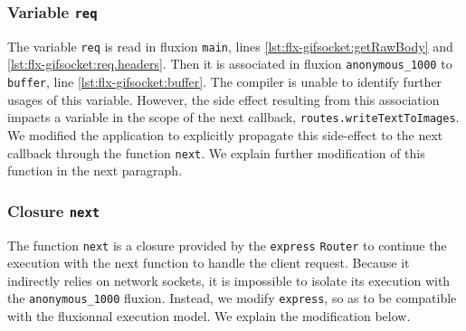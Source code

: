 \subsubsection{Variable \texttt{req}}

The variable \texttt{req} is read in fluxion \texttt{main}, lines \ref{lst:flx-gifsocket:getRawBody} and \ref{lst:flx-gifsocket:req.headers}.
Then it is associated in fluxion \texttt{anonymous\_1000} to \texttt{buffer}, line \ref{lst:flx-gifsocket:buffer}.
The compiler is unable to identify further usages of this variable.
However, the side effect resulting from this association impacts a variable in the scope of the next callback, \texttt{routes.writeTextToImages}.
We modified the application to explicitly propagate this side-effect to the next callback through the function \texttt{next}.
We explain further modification of this function in the next paragraph.


\subsubsection{Closure \texttt{next}}

The function \texttt{next} is a closure provided by the \texttt{express} \texttt{Router} to continue the execution with the next function to handle the client request.
Because it indirectly relies on network sockets, it is impossible to isolate its execution with the \texttt{anonymous\-\_1000} fluxion.
Instead, we modify \texttt{express}, so as to be compatible with the fluxionnal execution model.
We explain the modification below.%

